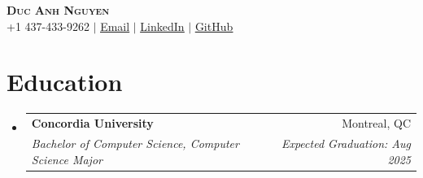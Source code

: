 \documentclass[letterpaper,11pt]{article}
\makeatletter
\newcommand{\resumeSubheading}[4]{
  \vspace{-2pt}\item
    \begin{tabular*}{0.97\textwidth}[t]{l@{\extracolsep{\fill}}r}
      \textbf{#1} & #2 \\
      \textit{\small#3} & \textit{\small #4} \\
    \end{tabular*}\vspace{-7pt}
}
\newcommand{\resumeSubHeadingListStart}{\begin{itemize}[leftmargin=0.15in, label={}]}
\newcommand{\resumeSubHeadingListEnd}{\end{itemize}}
\makeatother
\begin{document}

\begin{center}
    \textbf{\Huge \scshape Duc Anh Nguyen} \\ \vspace{1pt}
    \small +1 437-433-9262 $|$ \href{mailto:bongbang0101@gmail.com}{\underline{Email}} $|$ 
    \href{https://linkedin.com/in/ducanhnguyen0}{\underline{LinkedIn}} $|$
    \href{https://github.com/riyuc}{\underline{GitHub}}
\end{center}


\section{Education}
  \resumeSubHeadingListStart
    \resumeSubheading
      {Concordia University}{Montreal, QC}
      {Bachelor of Computer Science, Computer Science Major}{Expected Graduation: Aug 2025}
  \resumeSubHeadingListEnd
  
\end{document}
